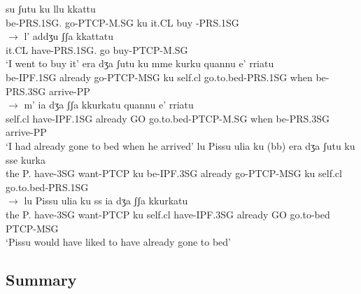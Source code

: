 \documentclass[output=paper]{langscibook}
\begin{document}
\ea\label{ac47}
    \ea \label{ac47a}
        \ea \label{ac47ai}\gll su        ʃutu        ku  llu   kkattu\\
       be-PRS.1SG.    go-PTCP-M.SG  ku   it.CL buy -PRS.1SG\\ 
        \ex \label{ac47aii}$\rightarrow$ \gll l’   addʒu       ʃʃa   kkattatu\\
       it.CL have-PRS.1SG.    go  buy-PTCP-M.SG\\
      \glt ‘I went to buy it’
        \z
    \ex\label{ac47b}
        \ea \label{ac47bi}\gll era      dʒa    ʃutu      ku mme   kurku     quannu  e’       rriatu \\
       be-IPF.1SG already go-PTCP-MSG ku self.cl go.to.bed-PRS.1SG
       when    be-PRS.3SG  arrive-PP\\
        \ex    \label{ac47bii}$\rightarrow$  \gll m’   ia        dʒa   ʃʃa  kkurkatu        quannu  e’        rriatu\\
       self.cl  have-IPF.1SG already GO  go.to.bed-PTCP-M.SG  
       when    be-PRS.3SG  arrive-PP\\
       \glt ‘I had already gone to bed when he arrived’
        \z
    \ex\label{ac47c}
        \ea \label{ac47ci}\gll lu Pissu ulia   ku    (bb) era    dʒa   ʃutu         ku sse    kurka\\
       the P.  have-3SG want-PTCP ku be-IPF.3SG already go-PTCP-MSG    ku self.cl   go.to.bed-PRS.1SG\\
        \ex  \label{ac47cii}  $\rightarrow$ \gll lu Pissu ulia   ku       ss   ia      dʒa         ʃʃa  kkurkatu\\
      the P.  have-3SG want-PTCP ku self.cl  have-IPF.3SG already 
       GO go.to-bed PTCP-MSG\\
      \glt ‘Pissu would have liked to have already gone to bed’
        \z
    \z
\z

\subsection{Summary}
\end{document}
